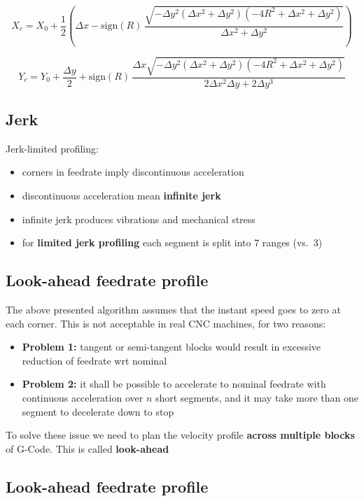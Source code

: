 \documentclass[
  letterpaper,
  DIV=11,
  numbers=noendperiod]{scrartcl}
\providecommand{\tightlist}{%
  \setlength{\itemsep}{0pt}\setlength{\parskip}{0pt}}
\begin{document}
\[
X_c = X_0 + \frac{1}{2}\left(\Delta x - \mathrm{sign}(R)\,\frac{\sqrt{-\Delta y^2 (\Delta x^2 + \Delta y^2)(-4R^2 + \Delta x^2 + \Delta y^2)}}{\Delta x^2 + \Delta y^2}\right)
\]

\[
Y_c = Y_0 + \frac{\Delta y}{2} + \mathrm{sign}(R)\,\frac{\Delta x \sqrt{-\Delta y^2 (\Delta x^2 + \Delta y^2)(-4R^2 + \Delta x^2 + \Delta y^2)}}{2\Delta x^2 \Delta y + 2\Delta y^3}
\]

\subsection{Jerk}\label{jerk}

Jerk-limited profiling:

\begin{itemize}
\tightlist
\item
  corners in feedrate imply discontinuous acceleration
\item
  discontinuous acceleration mean \textbf{infinite jerk}
\item
  infinite jerk produces vibrations and mechanical stress
\item
  for \textbf{limited jerk profiling} each segment is split into 7
  ranges (vs.~3)
\end{itemize}

\subsection{Look-ahead feedrate
profile}\label{look-ahead-feedrate-profile}

The above presented algorithm assumes that the instant speed goes to
zero at each corner. This is not acceptable in real CNC machines, for
two reasons:

\begin{itemize}
\tightlist
\item
  \textbf{Problem 1:} tangent or semi-tangent blocks would result in
  excessive reduction of feedrate wrt nominal
\item
  \textbf{Problem 2:} it shall be possible to accelerate to nominal
  feedrate with continuous acceleration over \(n\) short segments, and
  it may take more than one segment to decelerate down to stop
\end{itemize}

To solve these issue we need to plan the velocity profile \textbf{across
multiple blocks} of G-Code. This is called \textbf{look-ahead}

\subsection{Look-ahead feedrate
profile}\label{look-ahead-feedrate-profile-1}
\end{document}
